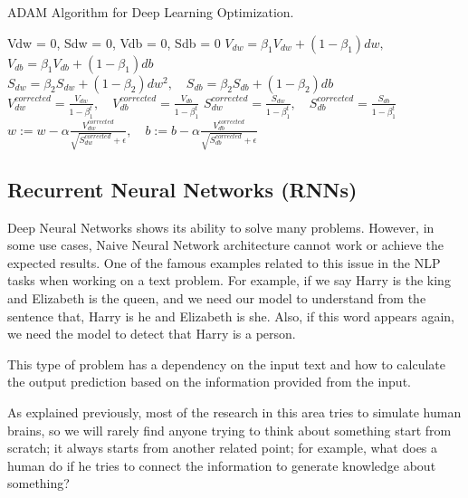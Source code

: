 \begin{algorithm}
\caption{ADAM Algorithm for Deep Learning Optimization.}\label{Alg:Adam}
\begin{algorithmic}
  \State Vdw = 0, Sdw = 0, Vdb = 0, Sdb = 0
   
  \State $V_{dw} = \beta_1 V_{dw} + (1-\beta_1) dw,$\quad$ V_{db} = \beta_1 V_{db} + (1-\beta_1) db$ 
  \State $S_{dw} = \beta_2 S_{dw} + (1-\beta_2) dw^2,\quad S_{db} = \beta_2 S_{db} + (1-\beta_2) db$ 
  \State $V_{dw}^{corrected} = \frac{V_{dw}}{1-\beta_1^t} ,\quad V_{db}^{corrected} = \frac{V_{db}}{1-\beta_1^t} $
  \State $S_{dw}^{corrected} = \frac{S_{dw}}{1-\beta_1^t} ,\quad S_{db}^{corrected} = \frac{S_{db}}{1-\beta_1^t} $
  \State $w:= w-\alpha \frac{V_{dw}^{corrected}}{\sqrt{S_{dw}^{corrected}} + \epsilon},\quad b:= b-\alpha \frac{V_{db}^{corrected}}{\sqrt{S_{db}^{corrected}} + \epsilon}$
  \EndFor
\end{algorithmic}
\end{algorithm}

\subsection{Recurrent Neural Networks (RNNs)}\label{Sec:RNN}

Deep Neural Networks shows its ability to solve many problems. However, in some use cases, Naive Neural Network architecture cannot work or achieve the expected results. One of the famous examples related to this issue in the NLP tasks when working on a text problem. For example, if we say Harry is the king and Elizabeth is the queen, and we need our model to understand from the sentence that, Harry is he and Elizabeth is she. Also, if this word appears again, we need the model to detect that Harry is a person.

This type of problem has a dependency on the input text and how to calculate the output prediction based on the information  provided from the input.

As explained previously, most of the research in this area tries to simulate human brains, so we will rarely find anyone trying to think about something start from scratch; it always starts from another related point; for example, what does a human do if he tries to connect the information to generate knowledge about something?

